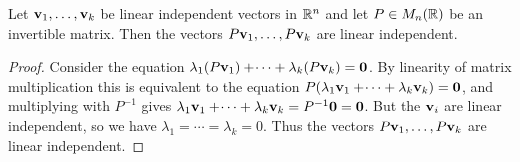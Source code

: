 \documentclass[10pt, a4paper]{article}
\begin{document}
\begin{lemma}\label{pre_linalg_lem_linindepvecmulmatrisindep}
    Let $\mathbf{v}_1, \dotsc, \mathbf{v}_k$ be linear independent vectors in $\mathbb{R} ^ n$ and let $P \in M_n(\mathbb{R})$ be an invertible matrix.
    Then the vectors $P\mathbf{v}_1, \dotsc,P\mathbf{v}_k$ are linear independent.
    \begin{proof}
        Consider the equation $\lambda_1(P\mathbf{v}_1) + \dotsi + \lambda_k(P\mathbf{v}_k) = \mathbf{0}$.
        By linearity of matrix multiplication this is equivalent to the equation $P(\lambda_1\mathbf{v}_1 + \dotsi + \lambda_k\mathbf{v}_k) = \mathbf{0}$,
        and multiplying with $P ^ {-1}$ gives $\lambda_1\mathbf{v}_1 + \dotsi + \lambda_k\mathbf{v}_k = P ^ {-1}\mathbf{0} = \mathbf{0}$.
        But the $\mathbf{v}_i$ are linear independent,
        so we have $\lambda_1 = \dotsi = \lambda_k = 0$.
        Thus the vectors $P\mathbf{v}_1, \dotsc, P\mathbf{v}_k$ are linear independent.
    \end{proof}
\end{lemma}
\end{document}

